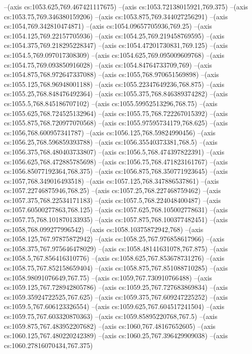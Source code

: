 --(axis cs:1053.625,769.467421117675)
--(axis cs:1053.72138015921,769.375)
--(axis cs:1053.75,769.346380159206)
--(axis cs:1053.875,769.344027256291)
--(axis cs:1054,769.342810474871)
--(axis cs:1054.09657705936,769.25)
--(axis cs:1054.125,769.22157705936)
--(axis cs:1054.25,769.219458769595)
--(axis cs:1054.375,769.218295228347)
--(axis cs:1054.47201730831,769.125)
--(axis cs:1054.5,769.097017308309)
--(axis cs:1054.625,769.095009609768)
--(axis cs:1054.75,769.093850916028)
--(axis cs:1054.84764733709,769)
--(axis cs:1054.875,768.972647337088)
--(axis cs:1055,768.970651569898)
--(axis cs:1055.125,768.96948001188)
--(axis cs:1055.22347649236,768.875)
--(axis cs:1055.25,768.848476492364)
--(axis cs:1055.375,768.846389374282)
--(axis cs:1055.5,768.845186707102)
--(axis cs:1055.59952513296,768.75)
--(axis cs:1055.625,768.724525132964)
--(axis cs:1055.75,768.722267015392)
--(axis cs:1055.875,768.720977070568)
--(axis cs:1055.97595734179,768.625)
--(axis cs:1056,768.600957341787)
--(axis cs:1056.125,768.59824990456)
--(axis cs:1056.25,768.596859393788)
--(axis cs:1056.35540373381,768.5)
--(axis cs:1056.375,768.480403733807)
--(axis cs:1056.5,768.474397822391)
--(axis cs:1056.625,768.472885785698)
--(axis cs:1056.75,768.471823161767)
--(axis cs:1056.85077192364,768.375)
--(axis cs:1056.875,768.350771923645)
--(axis cs:1057,768.349016493518)
--(axis cs:1057.125,768.347886537861)
--(axis cs:1057.22746875946,768.25)
--(axis cs:1057.25,768.227468759462)
--(axis cs:1057.375,768.22534171183)
--(axis cs:1057.5,768.224048400487)
--(axis cs:1057.60500277863,768.125)
--(axis cs:1057.625,768.105002778631)
--(axis cs:1057.75,768.101870133935)
--(axis cs:1057.875,768.100377482451)
--(axis cs:1058,768.099277996542)
--(axis cs:1058.10375872942,768)
--(axis cs:1058.125,767.97875872942)
--(axis cs:1058.25,767.976858617966)
--(axis cs:1058.375,767.975646478029)
--(axis cs:1058.48141631078,767.875)
--(axis cs:1058.5,767.856416310776)
--(axis cs:1058.625,767.853678731276)
--(axis cs:1058.75,767.852158659404)
--(axis cs:1058.875,767.851088710285)
--(axis cs:1058.98091076649,767.75)
--(axis cs:1059,767.730910766488)
--(axis cs:1059.125,767.728942805786)
--(axis cs:1059.25,767.727683869834)
--(axis cs:1059.35924722525,767.625)
--(axis cs:1059.375,767.609247225252)
--(axis cs:1059.5,767.606123326554)
--(axis cs:1059.625,767.604517241504)
--(axis cs:1059.75,767.603320870363)
--(axis cs:1059.85895220768,767.5)
--(axis cs:1059.875,767.483952207682)
--(axis cs:1060,767.48167652605)
--(axis cs:1060.125,767.480220242389)
--(axis cs:1060.25,767.396429909038)
--(axis cs:1060.27816070434,767.375)
